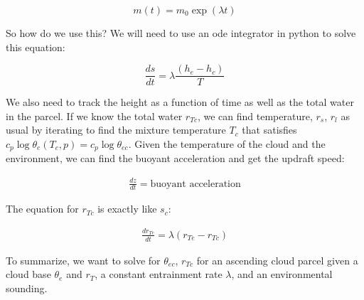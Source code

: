 \documentclass[12pt]{article}
\begin{document}
\begin{equation}
  \label{eq:sol}
  m(t) = m_0 \exp ( \lambda  t)
\end{equation}

So how do we use this?  We will need to use an ode integrator in python
to solve this equation:


\begin{equation}
  \label{eq:odeent}
     \frac{ds}{dt} = \lambda \frac{ (h_e - h_c)}{T}
\end{equation}

We also need to track the height as a function of time as well as the total water in
the parcel.
If we know the total water $r_{Tc}$, we can find temperature, $r_s$,
$r_l$ as usual by iterating to find the mixture temperature $T_c$
that satisfies $c_p \log \theta_{e}(T_c, p) = c_p \log \theta_{ec} $.  Given the temperature
of the cloud and the environment, we can find the buoyant acceleration and get
the updraft speed:

  \begin{gather}
\frac{ dz}{dt} = \text{buoyant acceleration} 
  \end{gather}


The equation for $r_{Tc}$ is exactly like $s_c$:

\begin{gather}
  \frac{dr_{Tc}}{dt} = \lambda (r_{Te} - r_{Tc})
\end{gather}

To summarize,  we want to solve for $\theta_{ec}$, $r_{Tc}$ for an ascending cloud parcel given
a cloud base $\theta_e$ and $r_T$, a constant entrainment rate $\lambda$, and an environmental
sounding.
\end{document}
